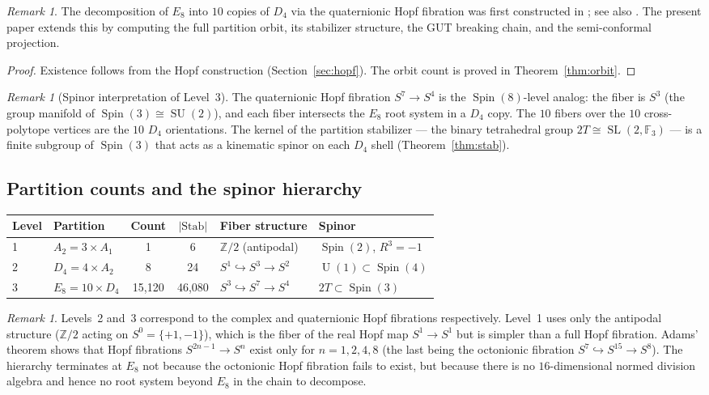 \documentclass[11pt,reqno]{amsart}
\theoremstyle{plain}
\theoremstyle{definition}
\theoremstyle{remark}
\newtheorem{remark}[theorem]{Remark}
\newcommand{\Z}{\mathbb{Z}}
\newcommand{\F}{\mathbb{F}}
\newcommand{\Stab}{\mathrm{Stab}}
\DeclareMathOperator{\Spin}{Spin}
\DeclareMathOperator{\SU}{SU}
\DeclareMathOperator{\U}{U}
\DeclareMathOperator{\SL}{SL}
\begin{document}
\begin{remark}
The decomposition of $E_8$ into $10$ copies of $D_4$ via the
quaternionic Hopf fibration was first constructed in
\cite{ClawsonFangIrwin2024}; see also \cite{FangIrwin2024}.
The present paper extends this by computing the full partition
orbit, its stabilizer structure, the GUT breaking chain, and
the semi-conformal projection.
\end{remark}

\begin{proof}
Existence follows from the Hopf construction
(Section~\ref{sec:hopf}).
The orbit count is proved in Theorem~\ref{thm:orbit}.
\end{proof}

\begin{remark}[Spinor interpretation of Level~3]
\label{rem:spinorlevel3}
The quaternionic Hopf fibration $S^7 \to S^4$ is the
$\Spin(8)$-level analog: the fiber is $S^3$ (the group
manifold of $\Spin(3) \cong \SU(2)$), and each fiber
intersects the $E_8$ root system in a $D_4$ copy.
The $10$ fibers over the $10$ cross-polytope vertices
are the $10$ $D_4$ orientations.
The kernel of the partition stabilizer --- the binary
tetrahedral group $2T \cong \SL(2,\F_3)$ --- is a
finite subgroup of $\Spin(3)$ that acts as a kinematic spinor
on each $D_4$ shell (Theorem~\ref{thm:stab}).
\end{remark}


\subsection{Partition counts and the spinor hierarchy}

\begin{center}
\begin{tabular}{@{}llccll@{}}
\toprule
Level & Partition & Count & $|\Stab|$ & Fiber structure & Spinor \\
\midrule
1 & $A_2 = 3 \times A_1$ & 1 & 6 & $\Z/2$ (antipodal) & $\Spin(2)$, $R^3 = -1$ \\
2 & $D_4 = 4 \times A_2$ & 8 & 24 & $S^1 \hookrightarrow S^3 \to S^2$ & $\U(1) \subset \Spin(4)$ \\
3 & $E_8 = 10 \times D_4$ & 15{,}120 & 46{,}080 & $S^3 \hookrightarrow S^7 \to S^4$ & $2T \subset \Spin(3)$ \\
\bottomrule
\end{tabular}
\end{center}

\begin{remark}\label{rem:threehopf}
Levels~2 and~3 correspond to the complex and quaternionic
Hopf fibrations respectively.
Level~1 uses only the antipodal structure ($\Z/2$ acting
on $S^0 = \{+1, -1\}$), which is the fiber of the real
Hopf map $S^1 \to S^1$ but is simpler than a full Hopf
fibration.
Adams' theorem \cite{Adams1960} shows that Hopf fibrations
$S^{2n-1} \to S^n$ exist only for $n = 1, 2, 4, 8$
(the last being the octonionic fibration
$S^7 \hookrightarrow S^{15} \to S^8$).
The hierarchy terminates at $E_8$ not because the octonionic
Hopf fibration fails to exist, but because there is no
$16$-dimensional normed division algebra and hence no root
system beyond $E_8$ in the chain to decompose.
\end{remark}
\end{document}
